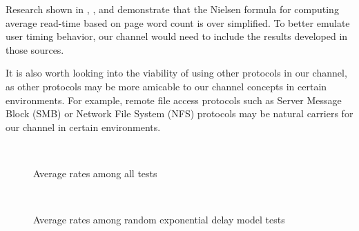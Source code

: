 \documentclass[10pt, conference]{IEEEtran}
\begin{document}
Research shown in \cite{Liu10}, \cite{Huang10}, and \cite{Weinreich06} demonstrate that the Nielsen formula for computing average read-time based on page word count is over simplified.  To better emulate user timing behavior, our channel would need to include the results developed in those sources.

It is also worth looking into the viability of using other protocols in our channel, as other protocols may be more amicable to our channel concepts in certain environments.  For example, remote file access protocols such as Server Message Block (SMB) or Network File System (NFS) protocols may be natural carriers for our channel in certain environments.

\begin{figure*}[ht!]
    \centering
        \\ 
    \caption{
        Average rates among all tests
     }
   \label{fig:subfigures}
\end{figure*}

\begin{figure*}[ht!]
    \centering
        \\ 
    \caption{
        Average rates among random exponential delay model tests
     }
   \label{fig:subfigures}
\end{figure*}

\clearpage



\end{document}
